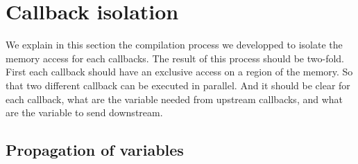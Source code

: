 








\section{Callback isolation}

We explain in this section the compilation process we developped to isolate the memory access for each callbacks.
The result of this process should be two-fold. First each callback should have an exclusive access on a region of the memory. So that two different callback can be executed in parallel. And it should be clear for each callback, what are the variable needed from upstream callbacks, and what are the variable to send downstream.

\subsection{Propagation of variables}



